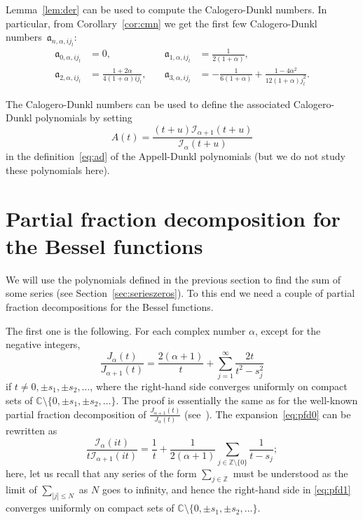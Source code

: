 \documentclass[10pt,a4paper]{article}
\theoremstyle{plain}
\theoremstyle{definition}
\numberwithin{equation}{section} %
\newcommand{\I}{\mathcal{I}}
\newcommand{\am}{\mathfrak{a}}
\newcommand{\ZZ}{\mathbb{Z}}
\newcommand{\CC}{\mathbb{C}}
\newcommand{\ZZO}{\mathbb{Z} \setminus \{0\}}
\begin{document}
Lemma~\ref{lem:der} can be used to compute the Calogero-Dunkl numbers. In particular, from Corollary~\ref{cor:cmn}
we get the first few Calogero-Dunkl numbers~$\am_{n,\alpha,ij_l}$:
\begin{align}
\label{eq:mis1}
  \am_{0,\alpha,ij_l} &=0,
  \quad &\am_{1,\alpha,ij_l} &= \frac{1}{2(1+\alpha)},\\
\label{eq:mis2}
  \am_{2,\alpha,ij_l} &= \frac{1+2\alpha}{4(1+\alpha)ij_l},
  \quad &\am_{3,\alpha,ij_l} &= -\frac{1}{6(1+\alpha)}+\frac{1-4\alpha^2}{12(1+\alpha)j_l^2}.
\end{align}

The Calogero-Dunkl numbers can be used to define the associated Calogero-Dunkl polynomials by setting
\[
  A(t)=\frac{(t+u)\I_{\alpha+1}(t+u)}{\I_\alpha (t+u)}
\]
in the definition~\eqref{eq:ad} of the Appell-Dunkl polynomials (but we do not study these polynomials here).

\section{Partial fraction decomposition for the Bessel functions}
\label{sec:simplefr}

We will use the polynomials defined in the previous section to find the sum of some series (see Section~\ref{sec:serieszeros}). To this end we need a couple of partial fraction decompositions for the Bessel functions.

The first one is the following. For each complex number $\alpha$, except for the negative integers,
\begin{equation}
\label{eq:pfd0}
   \frac{J_\alpha(t)}{J_{\alpha+1}(t)}
   = \frac{2(\alpha+1)}{t} + \sum_{j=1}^{\infty} \frac{2t}{t^2-s_j^2}
\end{equation}
if $t \not= 0, \pm s_1,\pm s_2,\dots$,
where the right-hand side converges uniformly on compact sets of $\CC \setminus \{0, \pm s_1,\pm s_2,\dots\}$. The proof is essentially the same as for the well-known partial fraction decomposition of $\frac{J_{\alpha+1}(t)}{J_\alpha(t)}$
(see~\cite[\S\,15.41, p.~497--498]{Wat}). The expansion~\eqref{eq:pfd0} can be rewritten as
\begin{equation}
\label{eq:pfd1}
   \frac{\I_\alpha(it)}{t\I_{\alpha+1}(it)}
   = \frac{1}{t} +
   \frac{1}{2(\alpha+1)}
   \sum_{j\in \ZZO} \frac{1}{t-s_j};
\end{equation}
here, let us recall that any series of the form $\sum_{j\in \ZZ}$ must be understood as the limit of $\sum_{|j|\leq N}$ as $N$ goes to infinity, and hence the right-hand side in \eqref{eq:pfd1} converges uniformly on compact sets of
$\CC \setminus \{0, \pm s_1,\pm s_2,\dots\}$.
\end{document}
